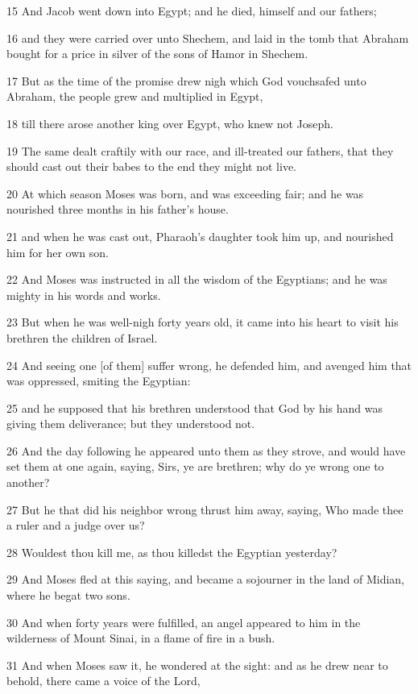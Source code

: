 \par 15 And Jacob went down into Egypt; and he died, himself and our fathers;
\par 16 and they were carried over unto Shechem, and laid in the tomb that Abraham bought for a price in silver of the sons of Hamor in Shechem.
\par 17 But as the time of the promise drew nigh which God vouchsafed unto Abraham, the people grew and multiplied in Egypt,
\par 18 till there arose another king over Egypt, who knew not Joseph.
\par 19 The same dealt craftily with our race, and ill-treated our fathers, that they should cast out their babes to the end they might not live.
\par 20 At which season Moses was born, and was exceeding fair; and he was nourished three months in his father's house.
\par 21 and when he was cast out, Pharaoh's daughter took him up, and nourished him for her own son.
\par 22 And Moses was instructed in all the wisdom of the Egyptians; and he was mighty in his words and works.
\par 23 But when he was well-nigh forty years old, it came into his heart to visit his brethren the children of Israel.
\par 24 And seeing one [of them] suffer wrong, he defended him, and avenged him that was oppressed, smiting the Egyptian:
\par 25 and he supposed that his brethren understood that God by his hand was giving them deliverance; but they understood not.
\par 26 And the day following he appeared unto them as they strove, and would have set them at one again, saying, Sirs, ye are brethren; why do ye wrong one to another?
\par 27 But he that did his neighbor wrong thrust him away, saying, Who made thee a ruler and a judge over us?
\par 28 Wouldest thou kill me, as thou killedst the Egyptian yesterday?
\par 29 And Moses fled at this saying, and became a sojourner in the land of Midian, where he begat two sons.
\par 30 And when forty years were fulfilled, an angel appeared to him in the wilderness of Mount Sinai, in a flame of fire in a bush.
\par 31 And when Moses saw it, he wondered at the sight: and as he drew near to behold, there came a voice of the Lord,
